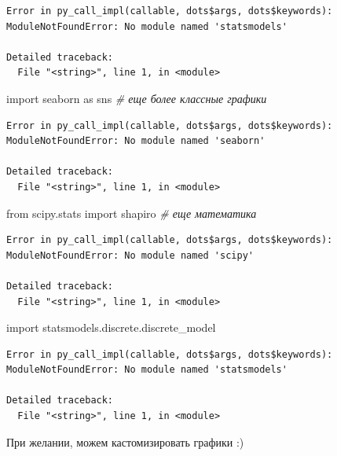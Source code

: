 \documentclass[]{book}
\newenvironment{Shaded}{\begin{snugshade}}{\end{snugshade}}
\newcommand{\CommentTok}[1]{\textcolor[rgb]{0.56,0.35,0.01}{\textit{#1}}}
\newcommand{\ImportTok}[1]{#1}
\newcommand{\NormalTok}[1]{#1}
\begin{document}
\begin{verbatim}
Error in py_call_impl(callable, dots$args, dots$keywords): ModuleNotFoundError: No module named 'statsmodels'

Detailed traceback: 
  File "<string>", line 1, in <module>
\end{verbatim}

\begin{Shaded}
\begin{Highlighting}[]
\ImportTok{import}\NormalTok{ seaborn }\ImportTok{as}\NormalTok{ sns }\CommentTok{# еще более классные графики}
\end{Highlighting}
\end{Shaded}

\begin{verbatim}
Error in py_call_impl(callable, dots$args, dots$keywords): ModuleNotFoundError: No module named 'seaborn'

Detailed traceback: 
  File "<string>", line 1, in <module>
\end{verbatim}

\begin{Shaded}
\begin{Highlighting}[]
\ImportTok{from}\NormalTok{ scipy.stats }\ImportTok{import}\NormalTok{ shapiro }\CommentTok{# еще математика}
\end{Highlighting}
\end{Shaded}

\begin{verbatim}
Error in py_call_impl(callable, dots$args, dots$keywords): ModuleNotFoundError: No module named 'scipy'

Detailed traceback: 
  File "<string>", line 1, in <module>
\end{verbatim}

\begin{Shaded}
\begin{Highlighting}[]
\ImportTok{import}\NormalTok{ statsmodels.discrete.discrete_model}
\end{Highlighting}
\end{Shaded}

\begin{verbatim}
Error in py_call_impl(callable, dots$args, dots$keywords): ModuleNotFoundError: No module named 'statsmodels'

Detailed traceback: 
  File "<string>", line 1, in <module>
\end{verbatim}

При желании, можем кастомизировать графики :)
\end{document}
